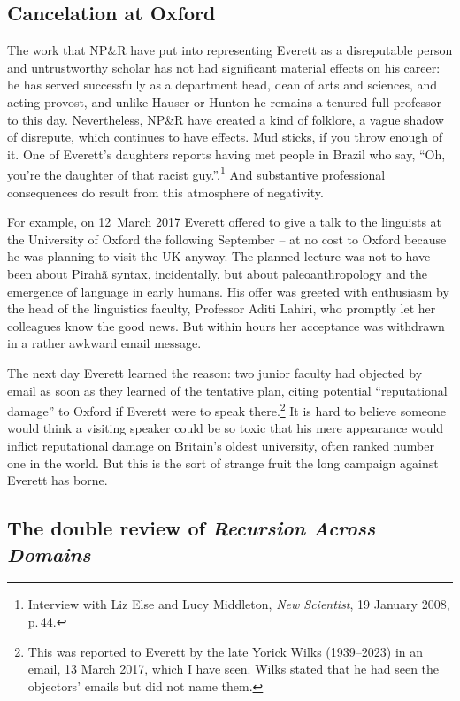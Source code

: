 \documentclass[output=paper,colorlinks,citecolor=brown
]{langscibook}
\begin{document}
\subsection{Cancelation at Oxford}
\label{sec-Oxford-cancelation}

The work that NP\&R have put into representing Everett as a
disreputable person and untrustworthy scholar has not had significant
material effects on his career: he has served successfully as a
department head, dean of arts and sciences, and acting provost, and
unlike Hauser or Hunton he remains a tenured full professor to this
day. Nevertheless, NP\&R have created a kind of folklore, a vague
shadow of disrepute, which continues to have effects. Mud sticks, if
you throw enough of it. One of Everett's daughters reports having met
people in Brazil who say, ``Oh, you're the daughter of that racist
guy.''.\footnote{\label{newscientist}%
   Interview with Liz Else and Lucy Middleton, \textit{New Scientist},
   19 January 2008, p.\,44.}
And substantive professional consequences do result from this atmosphere
of negativity.

For example, on 12~March 2017 Everett offered to give a talk to the
linguists at the University of Oxford the following September -- at
no cost to Oxford because he was planning to visit the UK anyway. The
planned lecture was not to have been about Pirah{\~a} syntax,
incidentally, but about paleoanthropology and the emergence of language
in early humans. His offer was greeted with enthusiasm by the head
of the linguistics faculty, Professor Aditi Lahiri, who promptly let
her colleagues know the good news. But within hours her acceptance
was withdrawn in a rather awkward email message.

The next day Everett learned the reason: two junior faculty had
objected by email as soon as they learned of the tentative plan,
citing potential ``reputational damage'' to Oxford if Everett were
to speak there.\footnote{\label{yorick}%
   This was reported to Everett by the late Yorick Wilks (1939--2023)
   in an email, 13 March 2017, which I have seen. Wilks stated that
   he had seen the objectors' emails but did not name them.}
It is hard to believe someone would think a visiting speaker could
be so toxic that his mere appearance would inflict reputational
damage on Britain's oldest university, often ranked number one in
the world. But this is the sort of strange fruit the long campaign
against Everett has borne.

\subsection{The double review of \textit{Recursion Across Domains}}
\end{document}
